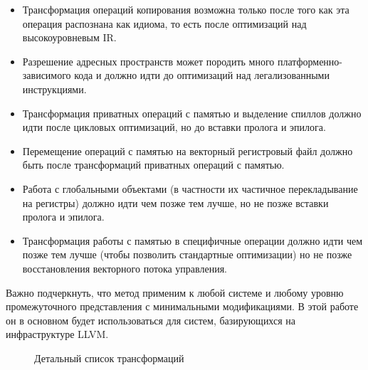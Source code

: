 \begin{itemize}
\item Трансформация операций копирования возможна только после того как эта операция распознана как идиома, то есть после оптимизаций над высокоуровневым IR.
\item Разрешение адресных пространств может породить много платформенно-зависимого кода и должно идти до оптимизаций над легализованными инструкциями.
\item Трансформация приватных операций с памятью и выделение спиллов должно идти после цикловых оптимизаций, но до вставки пролога и эпилога.
\item Перемещение операций с памятью на векторный регистровый файл должно быть после трансформаций приватных операций с памятью.
\item Работа с глобальными объектами (в частности их частичное перекладывание на регистры) должно идти чем позже тем лучше, но не позже вставки пролога и эпилога.
\item Трансформация работы с памятью в специфичные операции должно идти чем позже тем лучше (чтобы позволить стандартные оптимизации) но не позже восстановления векторного потока управления.
\end{itemize}

Важно подчеркнуть, что метод применим к любой системе и любому уровню промежуточного представления с минимальными модификациями. В этой работе он в основном будет использоваться для систем, базирующихся на инфраструктуре LLVM.

\begin{figure}[ht]
    \caption{Детальный список трансформаций}\label{fig:passmgr}
\end{figure}

